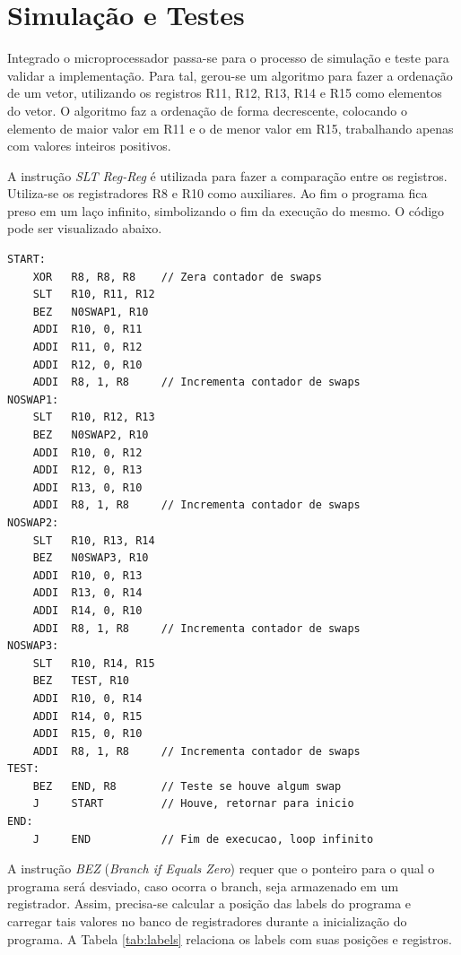 \documentclass[11pt,a4paper,titlepage]{article}
\begin{document}
\section{Simulação e Testes}

Integrado o microprocessador passa-se para o processo de simulação e teste para validar a implementação. Para tal, gerou-se um algoritmo para fazer a ordenação de um vetor, utilizando os registros R11, R12, R13, R14 e R15 como elementos do vetor. O algoritmo faz a ordenação de forma decrescente, colocando o elemento de maior valor em R11 e o de menor valor em R15, trabalhando apenas com valores inteiros positivos.

A instrução \textit{SLT Reg-Reg} é utilizada para fazer a comparação entre os registros. Utiliza-se os registradores R8 e R10 como auxiliares. Ao fim o programa fica preso em um laço infinito, simbolizando o fim da execução do mesmo. O código pode ser visualizado abaixo.

\lstset{language=[mips]Assembler}
\begin{lstlisting}
START:
    XOR   R8, R8, R8    // Zera contador de swaps
    SLT   R10, R11, R12   
    BEZ   N0SWAP1, R10
    ADDI  R10, 0, R11
    ADDI  R11, 0, R12
    ADDI  R12, 0, R10
    ADDI  R8, 1, R8     // Incrementa contador de swaps
NOSWAP1:
    SLT   R10, R12, R13
    BEZ   N0SWAP2, R10
    ADDI  R10, 0, R12
    ADDI  R12, 0, R13
    ADDI  R13, 0, R10
    ADDI  R8, 1, R8     // Incrementa contador de swaps
NOSWAP2:
    SLT   R10, R13, R14
    BEZ   N0SWAP3, R10
    ADDI  R10, 0, R13
    ADDI  R13, 0, R14
    ADDI  R14, 0, R10
    ADDI  R8, 1, R8     // Incrementa contador de swaps
NOSWAP3:
    SLT   R10, R14, R15
    BEZ   TEST, R10
    ADDI  R10, 0, R14
    ADDI  R14, 0, R15
    ADDI  R15, 0, R10
    ADDI  R8, 1, R8     // Incrementa contador de swaps
TEST:
    BEZ   END, R8       // Teste se houve algum swap
    J     START         // Houve, retornar para inicio
END:
    J     END           // Fim de execucao, loop infinito
\end{lstlisting}

A instrução \textit{BEZ} (\textit{Branch if Equals Zero}) requer que o ponteiro para o qual o programa será desviado, caso ocorra o branch, seja armazenado em um registrador. Assim, precisa-se calcular a posição das labels do programa e carregar tais valores no banco de registradores durante a inicialização do programa. A Tabela \ref{tab:labels} relaciona os labels com suas posições e registros.
\end{document}

